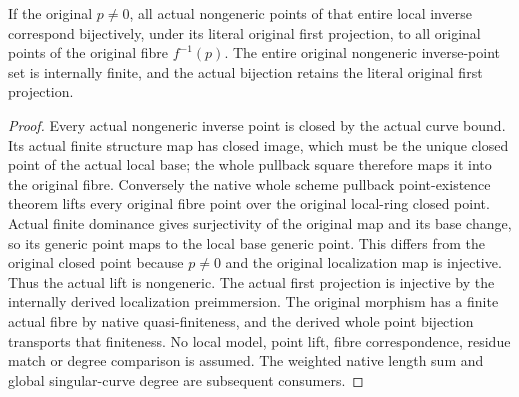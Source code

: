 \begin{theorem}
\label{thm:fc-at-prime-original-fibre-point-equiv}
\leanok
{}
If the original $p\ne0$, all actual nongeneric points of that entire local
inverse correspond bijectively, under its literal original first
projection, to all original points of the original fibre $f^{-1}(p)$.
The entire original nongeneric inverse-point set is internally finite, and
the actual bijection retains the literal original first projection.
\end{theorem}
\begin{proof}
Every actual nongeneric inverse point is closed by the actual curve bound.
Its actual finite structure map has closed image, which must be the unique
closed point of the actual local base; the whole pullback square therefore
maps it into the original fibre.  Conversely the native whole scheme
pullback point-existence theorem lifts every original fibre point over the
original local-ring closed point.  Actual finite dominance gives
surjectivity of the original map and its base change, so its generic point
maps to the local base generic point.  This differs from the original
closed point because $p\ne0$ and the original localization map is
injective.  Thus the actual lift is nongeneric.  The actual first projection
is injective by the internally derived localization preimmersion.
The original morphism has a finite actual fibre by native quasi-finiteness,
and the derived whole point bijection transports that finiteness.
No local model, point lift, fibre correspondence, residue match or degree
comparison is assumed.  The weighted native length sum and global
singular-curve degree are subsequent consumers.
\end{proof}
